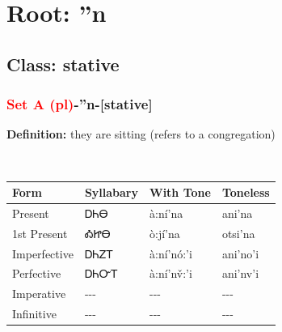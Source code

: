\needspace{4in}
\section*{Root: ''n}
\nopagebreak
{}
\needspace{3in}
\subsection*{Class: stative}
\nopagebreak
\needspace{2in}
\subsubsection*{\textcolor{Red}{Set A (pl)}{-}\textbf{''n}{-}[stative]}
\nopagebreak
\textbf{Definition: } they are sitting (refers to a congregation)
\\[0.5em]
\begin{tabularx}{\textwidth}{l X X X}%
\toprule%
\textbf{Form}&\textbf{Syllabary}&\textbf{With Tone}&\textbf{Toneless}\\%
\midrule%
Present&ᎠᏂᎾ&à:ní’na&ani'na\\%
1st Present&ᎣᏥᎾ&ò:jí’na&otsi'na\\%
Imperfective&ᎠᏂᏃᎢ&à:ní’nó:’i&ani'no'i\\%
Perfective&ᎠᏂᏅᎢ&à:ní’nv̌:’i&ani'nv'i\\%
Imperative&{-}{-}{-}&{-}{-}{-}&{-}{-}{-}\\%
Infinitive&{-}{-}{-}&{-}{-}{-}&{-}{-}{-}\\%
\bottomrule%
\end{tabularx}
\\[1em]